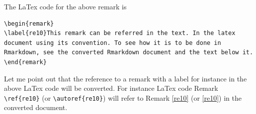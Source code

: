 \documentclass[12pt,svgnames]{article}
\begin{document}
The LaTex code for the above remark is
\begin{verbatim}
\begin{remark}
\label{re10}This remark can be referred in the text. In the latex document using its convention. To see how it is to be done in Rmarkdown, see the converted Rmarkdown document and the text below it.
\end{remark}
\end{verbatim}
Let me point out that the reference to a remark with a label for instance in the above LaTex code will be converted. For instance LaTex code Remark \verb&\ref{re10}& (or \verb&\autoref{re10}&) will refer to Remark \ref{re10} (or \autoref{re10}) in the converted document.

 
\printbibliography
\end{document}
